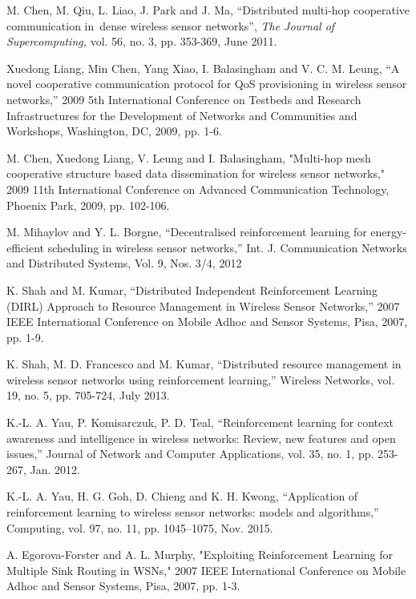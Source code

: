 \documentclass[journal]{IEEEtran}
\begin{document}
\begin{thebibliography}{1}
M. Chen, M. Qiu, L. Liao, J. Park and J. Ma, ``Distributed multi-hop cooperative communication in dense wireless sensor networks'', \emph{The Journal of Supercomputing,} vol. 56, no. 3, pp. 353-369, June 2011.

Xuedong Liang, Min Chen, Yang Xiao, I. Balasingham and V. C. M. Leung, ``A novel cooperative communication protocol for QoS provisioning in wireless sensor networks,'' 2009 5th International Conference on Testbeds and Research Infrastructures for the Development of Networks and Communities and Workshops, Washington, DC, 2009, pp. 1-6.

M. Chen, Xuedong Liang, V. Leung and I. Balasingham, "Multi-hop mesh cooperative structure based data dissemination for wireless sensor networks," 2009 11th International Conference on Advanced Communication Technology, Phoenix Park, 2009, pp. 102-106.

M. Mihaylov and Y. L. Borgne, ``Decentralised reinforcement learning for energy-efficient scheduling in wireless sensor networks,'' Int. J. Communication Networks and Distributed Systems, Vol. 9, Nos. 3/4, 2012

K. Shah and M. Kumar, ``Distributed Independent Reinforcement Learning (DIRL) Approach to Resource Management in Wireless Sensor Networks,'' 2007 IEEE International Conference on Mobile Adhoc and Sensor Systems, Pisa, 2007, pp. 1-9.

K. Shah, M. D. Francesco and M. Kumar, ``Distributed resource management in wireless sensor networks using reinforcement learning,'' Wireless Networks,
vol. 19, no. 5, pp. 705-724, July 2013.

K.-L. A. Yau, P. Komisarczuk, P. D. Teal, ``Reinforcement learning for context awareness and intelligence in wireless
networks: Review, new features and open issues,'' Journal of Network and Computer Applications, vol. 35, no. 1, pp. 253-267, Jan. 2012.

K.-L. A. Yau, H. G. Goh, D. Chieng and K. H. Kwong, ``Application of reinforcement learning to wireless sensor networks: models and algorithms,'' Computing, vol. 97, no. 11, pp. 1045–1075, Nov. 2015.

A. Egorova-Forster and A. L. Murphy, "Exploiting Reinforcement Learning for Multiple Sink Routing in WSNs," 2007 IEEE International Conference on Mobile Adhoc and Sensor Systems, Pisa, 2007, pp. 1-3.


\end{thebibliography}
\end{document}
